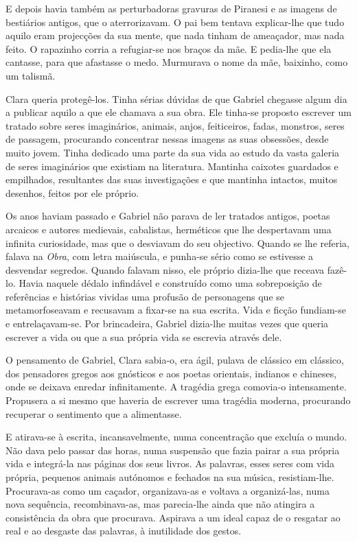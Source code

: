 E depois havia também as perturbadoras gravuras de Piranesi e as imagens
de bestiários antigos, que o aterrorizavam. O pai bem tentava
explicar-lhe que tudo aquilo eram projecções da sua mente, que nada
tinham de ameaçador, mas nada feito. O rapazinho corria a refugiar-se
nos braços da mãe. E pedia-lhe que ela cantasse, para que afastasse o
medo. Murmurava o nome da mãe, baixinho, como um talismã.

Clara queria protegê-los. Tinha sérias dúvidas de que Gabriel chegasse
algum dia a publicar aquilo a que ele chamava a sua obra. Ele tinha-se
proposto escrever um tratado sobre seres imaginários, animais, anjos,
feiticeiros, fadas, monstros, seres de passagem, procurando concentrar
nessas imagens as suas obsessões, desde muito jovem. Tinha dedicado uma
parte da sua vida ao estudo da vasta galeria de seres imaginários que
existiam na literatura. Mantinha caixotes guardados e empilhados,
resultantes das suas investigações e que mantinha intactos, muitos
desenhos, feitos por ele próprio.

Os anos haviam passado e Gabriel não parava de ler tratados antigos,
poetas arcaicos e autores medievais, cabalistas, herméticos que lhe
despertavam uma infinita curiosidade, mas que o desviavam do seu
objectivo. Quando se lhe referia, falava na \emph{Obra}, com letra
maiúscula, e punha-se sério como se estivesse a desvendar segredos.
Quando falavam nisso, ele próprio dizia-lhe que receava fazê-lo. Havia
naquele dédalo infindável e construído como uma sobreposição de
referências e histórias vividas uma profusão de personagens que se
metamorfoseavam e recusavam a fixar-se na sua escrita. Vida e ficção
fundiam-se e entrelaçavam-se. Por brincadeira, Gabriel dizia-lhe muitas
vezes que queria escrever a vida ou que a sua própria vida se escrevia
através dele.

O pensamento de Gabriel, Clara sabia-o, era ágil, pulava de clássico em
clássico, dos pensadores gregos aos gnósticos e aos poetas orientais,
indianos e chineses, onde se deixava enredar infinitamente. A tragédia
grega comovia-o intensamente. Propusera a si mesmo que haveria de
escrever uma tragédia moderna, procurando recuperar o sentimento que a
alimentasse.

E atirava-se à escrita, incansavelmente, numa concentração que excluía o
mundo. Não dava pelo passar das horas, numa suspensão que fazia pairar a
sua própria vida e integrá-la nas páginas dos seus livros. As palavras,
esses seres com vida própria, pequenos animais autónomos e fechados na
sua música, resistiam-lhe. Procurava-as como um caçador, organizava-as e
voltava a organizá-las, numa nova sequência, recombinava-as, mas
parecia-lhe ainda que não atingira a consistência da obra que procurava.
Aspirava a um ideal capaz de o resgatar ao real e ao desgaste das
palavras, à inutilidade dos gestos.

